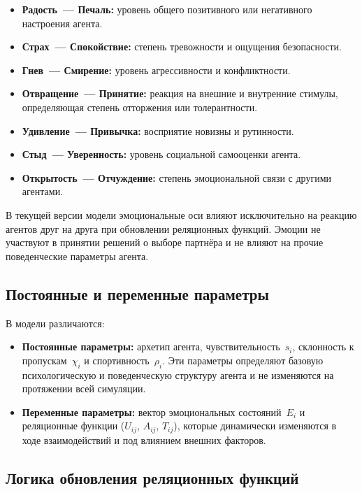 \documentclass[12pt]{article}
\begin{document}
\begin{itemize}
    \item \textbf{Радость~--- Печаль:} уровень общего позитивного или негативного настроения агента.
    \item \textbf{Страх~--- Спокойствие:} степень тревожности и ощущения безопасности.
    \item \textbf{Гнев~--- Смирение:} уровень агрессивности и конфликтности.
    \item \textbf{Отвращение~--- Принятие:} реакция на внешние и внутренние стимулы, определяющая степень отторжения или толерантности.
    \item \textbf{Удивление~--- Привычка:} восприятие новизны и рутинности.
    \item \textbf{Стыд~--- Уверенность:} уровень социальной самооценки агента.
    \item \textbf{Открытость~--- Отчуждение:} степень эмоциональной связи с другими агентами.
\end{itemize}

В текущей версии модели эмоциональные оси влияют исключительно на реакцию агентов друг на друга при обновлении реляционных функций. Эмоции не участвуют в принятии решений о выборе партнёра и не влияют на прочие поведенческие параметры агента.

\subsection{Постоянные и переменные параметры}

В модели различаются:
\begin{itemize}
    \item \textbf{Постоянные параметры:} архетип агента, чувствительность~$s_i$, склонность к пропускам~$\chi_i$ и спортивность~$\rho_i$. Эти параметры определяют базовую психологическую и поведенческую структуру агента и не изменяются на протяжении всей симуляции.
    \item \textbf{Переменные параметры:} вектор эмоциональных состояний~$E_i$ и реляционные функции ($U_{ij}$, $A_{ij}$, $T_{ij}$), которые динамически изменяются в ходе взаимодействий и под влиянием внешних факторов.
\end{itemize}

\subsection{Логика обновления реляционных функций}
\end{document}
